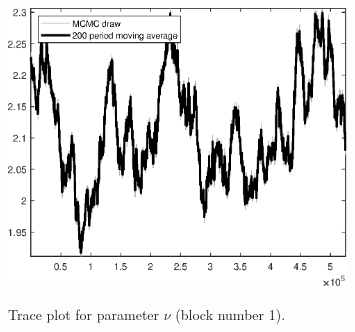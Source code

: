 \begin{figure}[H]
\centering
  \includegraphics[width=0.8\textwidth]{BRS_growth_KPR/graphs/TracePlot_xi_blck_1}\\
    \caption{Trace plot for parameter $\nu$ (block number 1).}
\end{figure}
